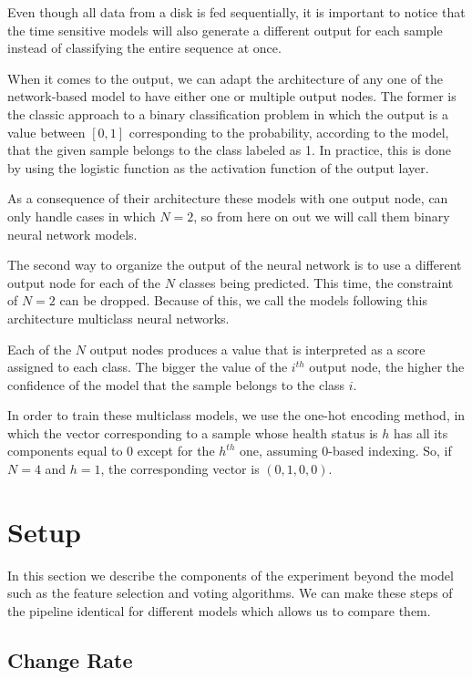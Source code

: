 Even though all data from a disk is fed sequentially, it is important to notice that the time sensitive models will also generate a different output for each sample instead of classifying the entire sequence at once.

When it comes to the output, we can adapt the architecture of any one of the network-based model to have either one or multiple output nodes.
The former is the classic approach to a binary classification problem in which the output is a value between $[0, 1]$ corresponding to the probability, according to the model, that the given sample belongs to the class labeled as 1.
In practice, this is done by using the logistic function as the activation function of the output layer.

As a consequence of their architecture these models with one output node, can only handle cases in which $N = 2$, so from here on out we will call them binary neural network models.

The second way to organize the output of the neural network is to use a different output node for each of the $N$ classes being predicted.
This time, the constraint of $N=2$ can be dropped.
Because of this, we call the models following this architecture multiclass neural networks.

Each of the $N$ output nodes produces a value that is interpreted as a score assigned to each class.
The bigger the value of the $i^{th}$ output node, the higher the confidence of the model that the sample belongs to the class $i$.

In order to train these multiclass models, we use the one-hot encoding method, in which the vector corresponding to a sample whose health status is $h$ has all its components equal to 0 except for the $h^{th}$ one, assuming 0-based indexing.
So, if $N = 4$ and $h = 1$, the corresponding vector is $(0,1,0,0)$.

\section{Setup}\label{sec:setup}

In this section we describe the components of the experiment beyond the model such as the feature selection and voting algorithms.
We can make these steps of the pipeline identical for different models which allows us to compare them.

\subsection{Change Rate}\label{subsec:change_rate}

